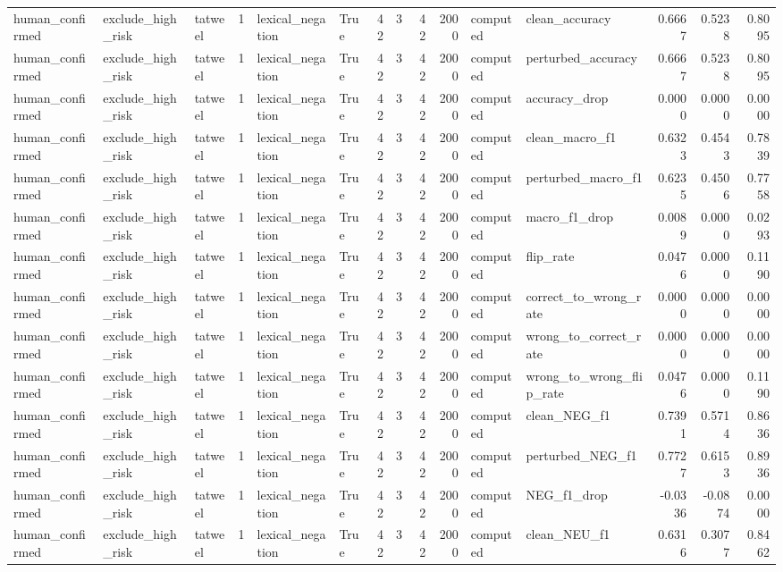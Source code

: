 \begin{tabular}{lllrllrrrrllrrr}
human_confirmed & exclude_high_risk & tatweel & 1 & lexical_negation & True & 42 & 3 & 42 & 2000 & computed & clean_accuracy & 0.6667 & 0.5238 & 0.8095 \\
human_confirmed & exclude_high_risk & tatweel & 1 & lexical_negation & True & 42 & 3 & 42 & 2000 & computed & perturbed_accuracy & 0.6667 & 0.5238 & 0.8095 \\
human_confirmed & exclude_high_risk & tatweel & 1 & lexical_negation & True & 42 & 3 & 42 & 2000 & computed & accuracy_drop & 0.0000 & 0.0000 & 0.0000 \\
human_confirmed & exclude_high_risk & tatweel & 1 & lexical_negation & True & 42 & 3 & 42 & 2000 & computed & clean_macro_f1 & 0.6323 & 0.4543 & 0.7839 \\
human_confirmed & exclude_high_risk & tatweel & 1 & lexical_negation & True & 42 & 3 & 42 & 2000 & computed & perturbed_macro_f1 & 0.6235 & 0.4506 & 0.7758 \\
human_confirmed & exclude_high_risk & tatweel & 1 & lexical_negation & True & 42 & 3 & 42 & 2000 & computed & macro_f1_drop & 0.0089 & 0.0000 & 0.0293 \\
human_confirmed & exclude_high_risk & tatweel & 1 & lexical_negation & True & 42 & 3 & 42 & 2000 & computed & flip_rate & 0.0476 & 0.0000 & 0.1190 \\
human_confirmed & exclude_high_risk & tatweel & 1 & lexical_negation & True & 42 & 3 & 42 & 2000 & computed & correct_to_wrong_rate & 0.0000 & 0.0000 & 0.0000 \\
human_confirmed & exclude_high_risk & tatweel & 1 & lexical_negation & True & 42 & 3 & 42 & 2000 & computed & wrong_to_correct_rate & 0.0000 & 0.0000 & 0.0000 \\
human_confirmed & exclude_high_risk & tatweel & 1 & lexical_negation & True & 42 & 3 & 42 & 2000 & computed & wrong_to_wrong_flip_rate & 0.0476 & 0.0000 & 0.1190 \\
human_confirmed & exclude_high_risk & tatweel & 1 & lexical_negation & True & 42 & 3 & 42 & 2000 & computed & clean_NEG_f1 & 0.7391 & 0.5714 & 0.8636 \\
human_confirmed & exclude_high_risk & tatweel & 1 & lexical_negation & True & 42 & 3 & 42 & 2000 & computed & perturbed_NEG_f1 & 0.7727 & 0.6153 & 0.8936 \\
human_confirmed & exclude_high_risk & tatweel & 1 & lexical_negation & True & 42 & 3 & 42 & 2000 & computed & NEG_f1_drop & -0.0336 & -0.0874 & 0.0000 \\
human_confirmed & exclude_high_risk & tatweel & 1 & lexical_negation & True & 42 & 3 & 42 & 2000 & computed & clean_NEU_f1 & 0.6316 & 0.3077 & 0.8462 \\

\end{tabular}
